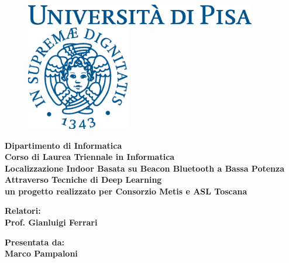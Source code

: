 \documentclass[12pt]{report}
\begin{document}
\begin{titlepage}
  \begin{figure}[t]
    \centering\includegraphics[width=0.9\textwidth]{./img/logo.eps}
    
    \vspace{1cm}
    
    \centering\includegraphics[width=0.4\textwidth]{./img/cherubino.eps}
  \end{figure}

  \begin{center}
    \textbf{ Dipartimento di Informatica\\ Corso di Laurea Triennale in Informatica\\}
    \vspace{15mm}
    {\LARGE{\bf Localizzazione Indoor Basata su Beacon Bluetooth a Bassa Potenza
    Attraverso Tecniche di Deep Learning}}\\
    {\large{\bf un progetto realizzato per Consorzio Metis e ASL Toscana}} \\
  \end{center}

  \vspace{20mm}

  \begin{minipage}[t]{0.47\textwidth}
    {\large{\bf Relatori:\\ Prof. Gianluigi Ferrari 
    }}
  \end{minipage}\hfill
  \begin{minipage}[t]{0.47\textwidth}\raggedleft
    {\large{\bf Presentata da: \\ Marco Pampaloni}}
  \end{minipage}

  \vfill



\end{titlepage}
\end{document}

